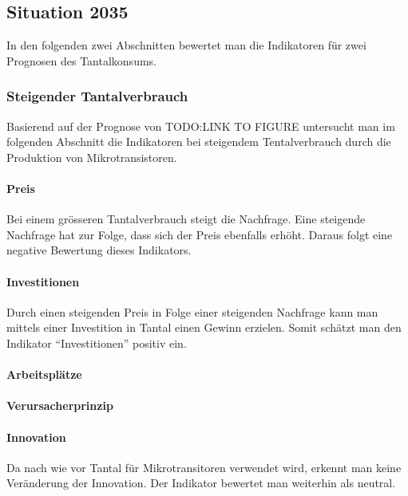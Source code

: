 \subsection{Situation 2035}
In den folgenden zwei Abschnitten bewertet man die Indikatoren für zwei
Prognosen des Tantalkonsums.

\subsubsection{Steigender Tantalverbrauch}
Basierend auf der Prognose von TODO:LINK TO FIGURE untersucht man im folgenden
Abschnitt die Indikatoren bei steigendem Tentalverbrauch durch die Produktion
von Mikrotransistoren.

\paragraph{Preis}
Bei einem grösseren Tantalverbrauch steigt die Nachfrage. Eine steigende
Nachfrage hat zur Folge, dass sich der Preis ebenfalls erhöht. Daraus folgt eine
negative Bewertung dieses Indikators.

\paragraph{Investitionen}
Durch einen steigenden Preis in Folge einer steigenden Nachfrage kann man
mittels einer Investition in Tantal einen Gewinn erzielen. Somit schätzt man den
Indikator ``Investitionen'' positiv ein.

\paragraph{Arbeitsplätze}

\paragraph{Verursacherprinzip}

\paragraph{Innovation}
Da nach wie vor Tantal für Mikrotransitoren verwendet wird, erkennt man keine
Veränderung der Innovation. Der Indikator bewertet man weiterhin als neutral.

